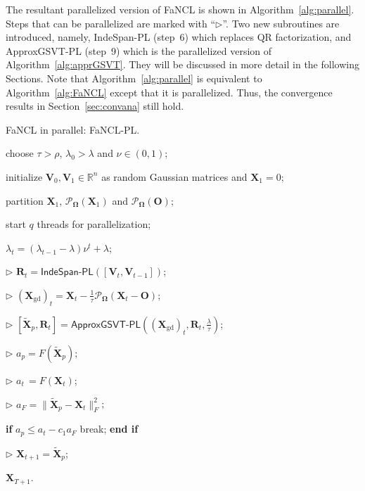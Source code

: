 \documentclass[10pt,journal,compsoc]{IEEEtran}
\def \R{\mathbb R}
\newcommand{\X}{\mathbf{X}}
\newcommand{\SO}[1]{\mathcal{P}_{\mathbf{\Omega}}(#1)}
\begin{document}
The resultant parallelized version of
\textsf{FaNCL} 
is shown in Algorithm~\ref{alg:parallel}.
Steps that can be parallelized 
are marked with ``$\rhd$''.
Two new subroutines are introduced, 
namely,
\textsf{IndeSpan-PL}  
(step~6) which replaces \textsf{QR} factorization, and
\textsf{ApproxGSVT-PL} 
(step~9) which is the parallelized version of Algorithm~\ref{alg:apprGSVT}.
They will be discussed in more detail in the following Sections.
Note that Algorithm~\ref{alg:parallel} is 
equivalent to Algorithm~\ref{alg:FaNCL} except that it is parallelized.
Thus, the
convergence results in Section~\ref{sec:convana} still hold.

\begin{algorithm}[ht]
\caption{\textsf{FaNCL} in parallel: \textsf{FaNCL-PL}.}
\begin{algorithmic}[1]
	\REQUIRE choose $\tau > \rho$, $\lambda_0 > \lambda$ and $\nu \in (0,1)$;
	
	\STATE initialize $\mathbf{V}_0, \mathbf{V}_1 \in \R^{n}$ as random Gaussian matrices and $\X_1 = 0$;
	
	\STATE partition $\X_1$, $\SO{\X_1}$ and $\SO{\mathbf{O}}$;
	
	\STATE start $q$ threads for parallelization;
	
	
	\STATE $\lambda_t = (\lambda_{t-1} -\lambda) \nu^t + \lambda$;
	
	\STATE $\rhd$ $\mathbf{R}_t = \textsf{IndeSpan-PL}\left( [\mathbf{V}_t, \mathbf{V}_{t - 1}] \right)$;
	
	\STATE $\rhd$ $(\X_{\text{gd}})_t = \X_t - \frac{1}{\tau} \SO{\X_t - \mathbf{O}}$;
	
	\STATE $\rhd$ $[ \tilde{\mathbf{X}}_p, \mathbf{R}_t  ]   = 
	\textsf{ApproxGSVT-PL} ( (\X_{\text{gd}})_t, \mathbf{R}_t, \frac{\lambda}{\tau} )$;
	
	\STATE $\rhd$ $a_p = F(  \tilde{\mathbf{X}}_p )$;
	
	\STATE $\rhd$ $a_t \, = F (\X_t)$;
	
	\STATE $\rhd$ $a_F = \| \tilde{\mathbf{X}}_p - \X_t \|_F^2$;
	 
	\STATE \textbf{if} {$a_p \le a_t - c_1 a_F$} break; \textbf{end if}
	
	\ENDFOR
	
	\STATE $\rhd$ $\X_{t + 1} = \tilde{\X}_p$;
	
	\ENDFOR
	
	\RETURN $\X_{T + 1}$.
\end{algorithmic}
\label{alg:parallel}
\end{algorithm}
\end{document}
